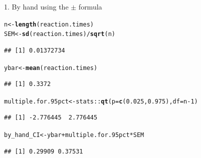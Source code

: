 \documentclass[10pt]{beamer}\usepackage[]{graphicx}\usepackage[]{color}
\makeatletter
\newcommand{\hlnum}[1]{\textcolor[rgb]{0.686,0.059,0.569}{#1}}%
\newcommand{\hlopt}[1]{\textcolor[rgb]{0,0,0}{#1}}%
\newcommand{\hlstd}[1]{\textcolor[rgb]{0.345,0.345,0.345}{#1}}%
\newcommand{\hlkwb}[1]{\textcolor[rgb]{0.69,0.353,0.396}{#1}}%
\newcommand{\hlkwc}[1]{\textcolor[rgb]{0.333,0.667,0.333}{#1}}%
\newcommand{\hlkwd}[1]{\textcolor[rgb]{0.737,0.353,0.396}{\textbf{#1}}}%
\newenvironment{kframe}{%
 \def\at@end@of@kframe{}%
 \ifinner\ifhmode%
  \def\at@end@of@kframe{\end{minipage}}%
  \begin{minipage}{\columnwidth}%
 \fi\fi%
 \def\FrameCommand##1{\hskip\@totalleftmargin \hskip-\fboxsep
 \colorbox{shadecolor}{##1}\hskip-\fboxsep
     \hskip-\linewidth \hskip-\@totalleftmargin \hskip\columnwidth}%
 \MakeFramed {\advance\hsize-\width
   \@totalleftmargin\z@ \linewidth\hsize
   \@setminipage}}%
 {\par\unskip\endMakeFramed%
 \at@end@of@kframe}
\newenvironment{knitrout}{}{} %
\makeatother
\begin{document}
\begin{frame}[fragile]{1. By hand using the $\pm$ formula}
\begin{knitrout}\tiny
{}\color{fgcolor}\begin{kframe}
\begin{alltt}
\hlstd{n} \hlkwb{<-} \hlkwd{length}\hlstd{(reaction.times)}
\hlstd{SEM} \hlkwb{<-} \hlkwd{sd}\hlstd{(reaction.times)}\hlopt{/}\hlkwd{sqrt}\hlstd{(n)}
\end{alltt}
\begin{verbatim}
## [1] 0.01372734
\end{verbatim}
\begin{alltt}
\hlstd{ybar} \hlkwb{<-} \hlkwd{mean}\hlstd{(reaction.times)}
\end{alltt}
\begin{verbatim}
## [1] 0.3372
\end{verbatim}
\begin{alltt}
\hlstd{multiple.for.95pct} \hlkwb{<-} \hlstd{stats}\hlopt{::}\hlkwd{qt}\hlstd{(}\hlkwc{p} \hlstd{=} \hlkwd{c}\hlstd{(}\hlnum{0.025}\hlstd{,} \hlnum{0.975}\hlstd{),} \hlkwc{df} \hlstd{= n}\hlopt{-}\hlnum{1}\hlstd{)}
\end{alltt}
\begin{verbatim}
## [1] -2.776445  2.776445
\end{verbatim}
\begin{alltt}
\hlstd{by_hand_CI} \hlkwb{<-} \hlstd{ybar} \hlopt{+} \hlstd{multiple.for.95pct} \hlopt{*} \hlstd{SEM}
\end{alltt}
\begin{verbatim}
## [1] 0.29909 0.37531
\end{verbatim}
\end{kframe}
\end{knitrout}
\end{frame}
\end{document}
